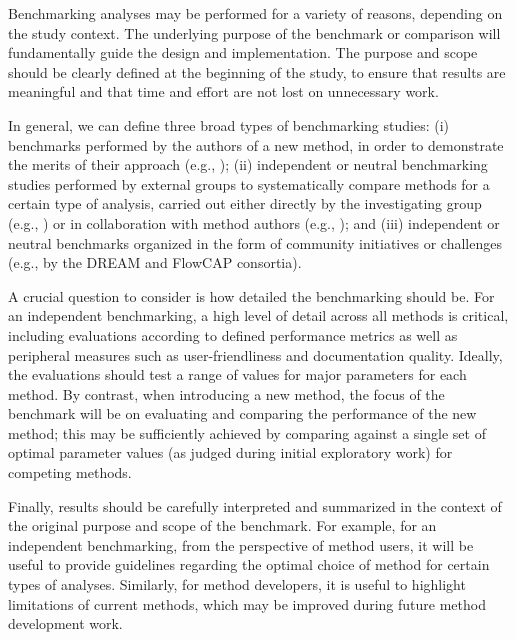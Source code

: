\documentclass[12pt, a4paper]{article}
\begin{document}
Benchmarking analyses may be performed for a variety of reasons, depending on the study context. The underlying purpose of the benchmark or comparison will fundamentally guide the design and implementation. The purpose and scope should be clearly defined at the beginning of the study, to ensure that results are meaningful and that time and effort are not lost on unnecessary work.

In general, we can define three broad types of benchmarking studies: (i) benchmarks performed by the authors of a new method, in order to demonstrate the merits of their approach (e.g., \citep{Weber2018, Nowicka2016, Levine2015, Zhou2014, Law2014}); (ii) independent or neutral benchmarking studies performed by external groups to systematically compare methods for a certain type of analysis, carried out either directly by the investigating group (e.g., \citep{Duo2018, Saelens2018a, Saelens2018b, Soneson2018, Weber2016, Baruzzo2017, Kanitz2015, Soneson2013, Rapaport2013, Dillies2012}) or in collaboration with method authors (e.g., \citep{Sage2015}); and (iii) independent or neutral benchmarks organized in the form of community initiatives or challenges (e.g., by the DREAM \citep{Weirauch2013, Costello2014, Kuffner2015, Ewing2015, Hill2016} and FlowCAP \citep{Aghaeepour2013, Aghaeepour2016} consortia).

A crucial question to consider is how detailed the benchmarking should be. For an independent benchmarking, a high level of detail across all methods is critical, including evaluations according to defined performance metrics as well as peripheral measures such as user-friendliness and documentation quality. Ideally, the evaluations should test a range of values for major parameters for each method. By contrast, when introducing a new method, the focus of the benchmark will be on evaluating and comparing the performance of the new method; this may be sufficiently achieved by comparing against a single set of optimal parameter values (as judged during initial exploratory work) for competing methods.

Finally, results should be carefully interpreted and summarized in the context of the original purpose and scope of the benchmark. For example, for an independent benchmarking, from the perspective of method users, it will be useful to provide guidelines regarding the optimal choice of method for certain types of analyses. Similarly, for method developers, it is useful to highlight limitations of current methods, which may be improved during future method development work.
\end{document}
